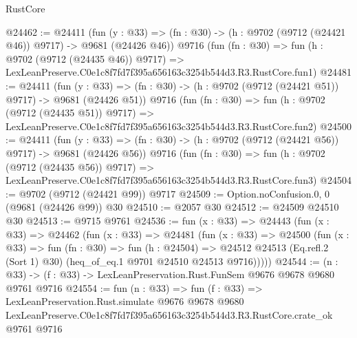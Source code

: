 \begin{lexlean}{RustCore}
\begin{coremodule}
@24462 := @24411
    (fun (y : @33) => (fn : @30) -> (h : @9702 (@9712 (@24421 @46)) @9717) -> @9681 (@24426 @46))
    @9716
    (fun (fn : @30) =>
    fun (h : @9702 (@9712 (@24435 @46)) @9717) =>
    LexLeanPreserve.C0e1c8f7fd7f395a656163c3254b544d3.R3.RustCore.fun1)
@24481 := @24411
    (fun (y : @33) => (fn : @30) -> (h : @9702 (@9712 (@24421 @51)) @9717) -> @9681 (@24426 @51))
    @9716
    (fun (fn : @30) =>
    fun (h : @9702 (@9712 (@24435 @51)) @9717) =>
    LexLeanPreserve.C0e1c8f7fd7f395a656163c3254b544d3.R3.RustCore.fun2)
@24500 := @24411
    (fun (y : @33) => (fn : @30) -> (h : @9702 (@9712 (@24421 @56)) @9717) -> @9681 (@24426 @56))
    @9716
    (fun (fn : @30) =>
    fun (h : @9702 (@9712 (@24435 @56)) @9717) =>
    LexLeanPreserve.C0e1c8f7fd7f395a656163c3254b544d3.R3.RustCore.fun3)
@24504 := @9702 (@9712 (@24421 @99)) @9717
@24509 := Option.noConfusion.{0, 0} (@9681 (@24426 @99)) @30
@24510 := @2057 @30
@24512 := @24509 @24510 @30
@24513 := @9715 @9761
@24536 := fun (x : @33) =>
  @24443
    (fun (x : @33) =>
    @24462
      (fun (x : @33) =>
      @24481
        (fun (x : @33) =>
        @24500
          (fun (x : @33) =>
          fun (fn : @30) =>
          fun (h : @24504) =>
          @24512 @24513 (Eq.refl.{2} (Sort 1) @30) (heq_of_eq.{1} @9701 @24510 @24513 @9716)))))
@24544 := (n : @33) -> (f : @33) -> LexLeanPreservation.Rust.FunSem @9676 @9678 @9680 @9761 @9716
@24554 := fun (n : @33) =>
  fun (f : @33) =>
  LexLeanPreservation.Rust.simulate
    @9676
    @9678
    @9680
    LexLeanPreserve.C0e1c8f7fd7f395a656163c3254b544d3.R3.RustCore.crate_ok
    @9761
    @9716
\end{coremodule}
\end{lexlean}
